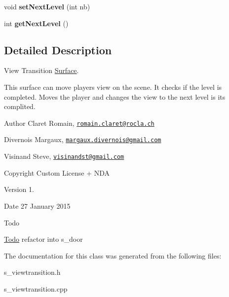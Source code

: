 \begin{DoxyCompactItemize}
\item 
\hypertarget{class_s___view_transition_a7aa555ea153a02bc957cce590c7f0660}{}void {\bfseries set\+Next\+Level} (int nb)\label{class_s___view_transition_a7aa555ea153a02bc957cce590c7f0660}

\item 
\hypertarget{class_s___view_transition_aef44e5819f80ec0689175510a7d50c37}{}int {\bfseries get\+Next\+Level} ()\label{class_s___view_transition_aef44e5819f80ec0689175510a7d50c37}

\end{DoxyCompactItemize}


\subsection{Detailed Description}
View Transition \hyperlink{class_surface}{Surface}. 

This surface can move player\textquotesingle{}s view on the scene. It checks if the level is completed. Moves the player and changes the view to the next level is it\textquotesingle{}s complited. \begin{DoxyAuthor}{Author}
Claret Romain, \href{mailto:romain.claret@rocla.ch}{\tt romain.\+claret@rocla.\+ch} 

Divernois Margaux, \href{mailto:margaux.divernois@gmail.com}{\tt margaux.\+divernois@gmail.\+com} 

Visinand Steve, \href{mailto:visinandst@gmail.com}{\tt visinandst@gmail.\+com} 
\end{DoxyAuthor}
\begin{DoxyCopyright}{Copyright}
Custom License + N\+D\+A 
\end{DoxyCopyright}
\begin{DoxyVersion}{Version}
1. 
\end{DoxyVersion}
\begin{DoxyDate}{Date}
27 January 2015 
\end{DoxyDate}
\begin{DoxyRefDesc}{Todo}
\item[\hyperlink{todo__todo000016}{Todo}]refactor into s\+\_\+door \end{DoxyRefDesc}


The documentation for this class was generated from the following files\+:\begin{DoxyCompactItemize}
\item 
s\+\_\+viewtransition.\+h\item 
s\+\_\+viewtransition.\+cpp\end{DoxyCompactItemize}
